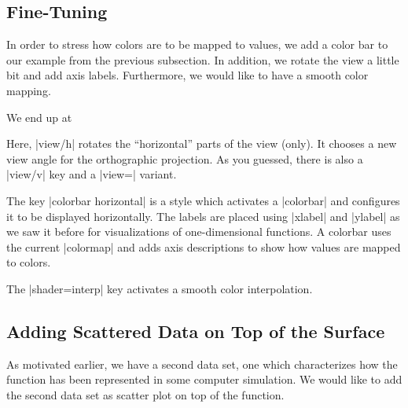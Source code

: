 \subsection{Fine-Tuning}

In order to stress how colors are to be mapped to values, we add a color bar to
our example from the previous subsection. In addition, we rotate the view a
little bit and add axis labels. Furthermore, we would like to have a smooth
color mapping.

We end up at
%
\pgfplotsexpensiveexample
\begin{codeexample}[]
\end{codeexample}
%
Here, |view/h| rotates the ``horizontal'' parts of the view (only). It chooses
a new view angle for the orthographic projection. As you guessed, there is also
a |view/v| key and a |view=| variant.

The key |colorbar horizontal| is a style which activates a |colorbar| and
configures it to be displayed horizontally. The labels are placed using
|xlabel| and |ylabel| as we saw it before for visualizations of one-dimensional
functions. A colorbar uses the current |colormap| and adds axis descriptions to
show how values are mapped to colors.

The |shader=interp| key activates a smooth color interpolation.


\subsection{Adding Scattered Data on Top of the Surface}

As motivated earlier, we have a second data set, one which characterizes how
the function has been represented in some computer simulation. We would like to
add the second data set as scatter plot on top of the function.

